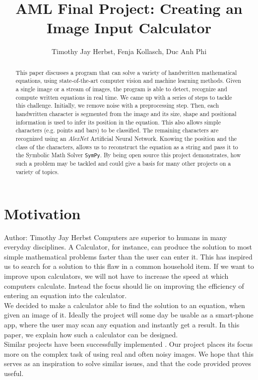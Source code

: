 \documentclass[12pt]{article}
\title{AML Final Project: Creating an Image Input Calculator} %
\author{Timothy Jay Herbst, Fenja Kollasch, Duc Anh Phi}
\begin{document}
	\maketitle
	
	\begin{abstract}
		This paper discusses a program that can solve a variety of handwritten mathematical equations, using state-of-the-art computer vision and machine learning methods.
		Given a single image or a stream of images, the program is able to detect, recognize and compute written equations in real time.
		We came up with a series of steps to tackle this challenge.
		Initially, we remove noise with a preprocessing step.
		Then, each handwritten character is segmented from the image and its size, shape and positional information is used to infer its position in the equation.
		This also allows simple characters (e.g. points and bars) to be classified.
		The remaining characters are recognized using an \textit{AlexNet} Artificial Neural Network.
		Knowing the position and the class of the characters, allows us to reconstruct the equation as a string and pass it to the Symbolic Math Solver \texttt{SymPy}.
		By being open source this project demonstrates, how such a problem may be tackled and could give a basis for many other projects on a variety of topics.
		
		
		
	\end{abstract}
	\newpage
	
	\tableofcontents
	
	\newpage
	\section{Motivation}
	\small{Author: Timothy Jay Herbst} \newline \newline
	Computers are superior to humans in many everyday disciplines.
	A Calculator, for instance, can produce the solution to most simple mathematical problems faster than the user can enter it.
	This has inspired us to search for a solution to this flaw in a common household item.
	If we want to improve upon calculators, we will not have to increase the speed at which computers calculate.
	Instead the focus should lie on improving the efficiency of entering an equation into the calculator.\\
	We decided to make a calculator able to find the solution to an equation, when given an image of it.
	Ideally the project will some day be usable as a smart-phone app, where the user may scan any equation and instantly get a result.
	In this paper, we explain how such a calculator can be designed.\\ Similar projects have been successfully implemented \cite{inspired-blog}. Our project places its focus more on the complex task of using real and often noisy images.
	We hope that this serves as an inspiration to solve similar issues, and that the code provided proves useful.
	
\end{document}
